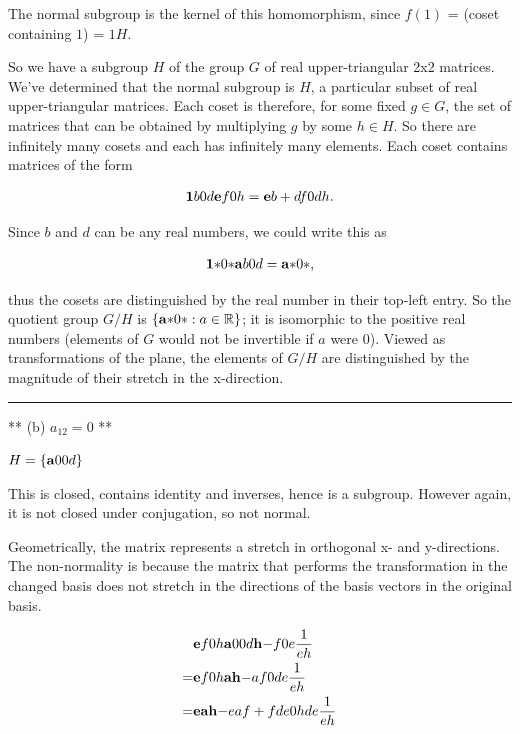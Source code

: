 The normal subgroup is the kernel of this homomorphism, since $f(1)$ = (coset
containing $1$) = $1H$.

So we have a subgroup $H$ of the group $G$ of real upper-triangular 2x2
matrices.  We've determined that the normal subgroup is $H$, a particular
subset of real upper-triangular matrices. Each coset is therefore, for some
fixed $g \in G$, the set of matrices that can be obtained by multiplying $g$ by
some $h \in H$. So there are infinitely many cosets and each has infinitely
many elements. Each coset contains matrices of the form

\begin{align*}
\mathbf{1}{b}
    {0}{d} \mathbf{e}{f}
               {0}{h} = \mathbf{e}{b + df}
                            {0}{dh    }.
\end{align*}

Since $b$ and $d$ can be any real numbers, we could write this as

\begin{align*}
\mathbf{1}{*}
    {0}{*} \mathbf{a}{b}
               {0}{d} = \mathbf{a}{*}
                            {0}{*},
\end{align*}

thus the cosets are distinguished by the real number in their top-left
entry. So the quotient group $G/H$ is $\left\{\tiny{\mathbf{a}{*}{0}{*}}: a \in
\mathbb{R}\right\}$; it is isomorphic to the positive real numbers (elements of $G$
would not be invertible if $a$ were $0$). Viewed as transformations of the
plane, the elements of $G/H$ are distinguished by the magnitude of their
stretch in the x-direction.

\hrule
** (b) $a_{12} = 0$ **

$H = \left\{ \mathbf{a}{0}
                 {0}{d} \right\}$

This is closed, contains identity and inverses, hence is a subgroup. However
again, it is not closed under conjugation, so not normal.

Geometrically, the matrix represents a stretch in orthogonal x- and
y-directions. The non-normality is because the matrix that performs the
transformation in the changed basis does not stretch in the directions of the
basis vectors in the original basis.

\begin{align*}
&\mathbf{e}{f}
     {0}{h} \mathbf{a}{0}
                {0}{d} \mathbf{h}{-f}
                           {0}{e } \frac{1}{eh} \\
= &\mathbf{e}{f}
       {0}{h} \mathbf{ah}{-af}
                  {0 }{de } \frac{1}{eh} \\
= &\mathbf{eah}{-eaf + fde}
       {0  }{hde       } \frac{1}{eh}
\end{align*}

